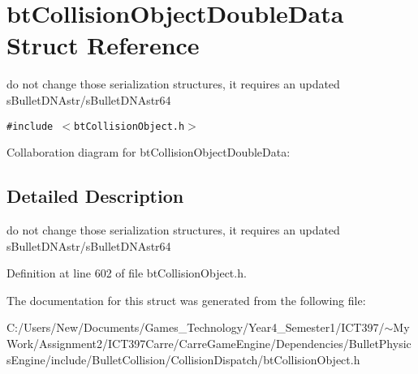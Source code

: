\hypertarget{structbt_collision_object_double_data}{
\section{btCollisionObjectDoubleData Struct Reference}
\label{structbt_collision_object_double_data}
}
do not change those serialization structures, it requires an updated sBulletDNAstr/sBulletDNAstr64  


{\tt \#include $<$btCollisionObject.h$>$}

Collaboration diagram for btCollisionObjectDoubleData:

\subsection{Detailed Description}
do not change those serialization structures, it requires an updated sBulletDNAstr/sBulletDNAstr64 

Definition at line 602 of file btCollisionObject.h.

The documentation for this struct was generated from the following file:\begin{CompactItemize}
\item 
C:/Users/New/Documents/Games\_\-Technology/Year4\_\-Semester1/ICT397/$\sim$My Work/Assignment2/ICT397Carre/CarreGameEngine/Dependencies/BulletPhysicsEngine/include/BulletCollision/CollisionDispatch/btCollisionObject.h\end{CompactItemize}
